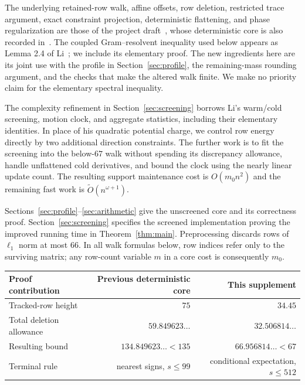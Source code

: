 \documentclass[11pt]{amsart}
\theoremstyle{remark}\newtheorem{remark}[theorem]{Remark}
\begin{document}
The underlying retained-row walk, affine offsets, row deletion, restricted
trace argument, exact constraint projection, deterministic flattening,
and phase regularization are those of the project draft~\cite{project},
whose deterministic core is also recorded in~\cite{core}. The coupled
Gram--resolvent inequality used below appears as Lemma 2.4 of Li~\cite{Li};
we include its elementary proof. The new ingredients here are its joint
use with the profile in Section~\ref{sec:profile}, the remaining-mass
rounding argument, and the checks that make the altered walk finite.
We make no priority claim for the elementary spectral inequality.

The complexity refinement in Section~\ref{sec:screening} borrows Li's
warm/cold screening, motion clock, and aggregate statistics, including
their elementary identities. In place of his quadratic potential charge,
we control row energy directly by two additional direction constraints.
The further work is to fit the screening into the below-$67$ walk without
spending its discrepancy allowance, handle unflattened cold derivatives,
and bound the clock using the nearly linear update count. The resulting support
maintenance cost is $O(m_0n^2)$ and the remaining fast work is
$\widetilde O(n^{\omega+1})$.

Sections~\ref{sec:profile}--\ref{sec:arithmetic} give the unscreened core
and its correctness proof. Section~\ref{sec:screening} specifies the
screened implementation proving the improved running time in
Theorem~\ref{thm:main}. Preprocessing discards rows of $\ell_1$ norm at
most 66. In all walk formulas below, row indices refer only to the surviving
matrix; any row-count variable $m$ in a core cost is consequently $m_0$.

\begin{center}
\begin{tabular}{lrr}
\toprule
Proof contribution & Previous deterministic core & This supplement\\
\midrule
Tracked-row height & $75$ & $34.45$\\
Total deletion allowance & $59.849623\ldots$ & $32.506814\ldots$\\
Resulting bound & $134.849623\ldots<135$ & $66.956814\ldots<67$\\
Terminal rule & nearest signs, $s\le99$ & conditional expectation, $s\le512$\\
\bottomrule
\end{tabular}
\end{center}
\end{document}
